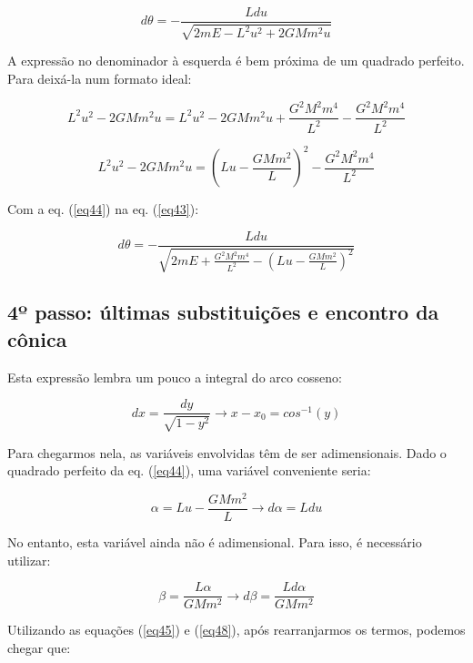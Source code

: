 \begin{equation}
	d\theta = -\frac{Ldu}{\sqrt{2mE -  L^2u^2 + 2GMm^2u}} \label{eq43}
\end{equation}

A expressão no denominador à esquerda é bem próxima de um quadrado perfeito. Para deixá-la num formato ideal:

\[
	L^2u^2 - 2GMm^2u = L^2u^2 - 2GMm^2u + \frac{G^2M^2m^4}{L^2} - \frac{G^2M^2m^4}{L^2}
\]

\begin{equation}
	L^2u^2 - 2GMm^2u = \left(Lu - \frac{GMm^2}{L}\right)^2 - \frac{G^2M^2m^4}{L^2} \label{eq44}
\end{equation}

Com a eq. (\ref{eq44}) na eq. (\ref{eq43}):

\begin{equation}
	d\theta = -\frac{Ldu}{\sqrt{2mE + \frac{G^2M^2m^4}{L^2} - \left(Lu - \frac{GMm^2}{L}\right)^2}}
	\label{eq45}
\end{equation}

\subsection{4º passo: últimas substituições e encontro da cônica}

Esta expressão lembra um pouco a integral do arco cosseno:

\begin{equation}
	dx = \frac{dy}{\sqrt{1-y^2}}\rightarrow x- x_0 = cos^{-1}(y) \label{eq46}
\end{equation}

Para chegarmos nela, as variáveis envolvidas têm de ser adimensionais. Dado o quadrado perfeito da eq.  (\ref{eq44}), uma variável conveniente seria:

\begin{equation}
	\alpha = Lu - \frac{GMm^2}{L}  \rightarrow d\alpha = Ldu \label{eq47}
\end{equation}

No entanto, esta variável ainda não é adimensional. Para isso, é necessário utilizar:

\begin{equation}
	\beta = \frac{L\alpha}{GMm^2} \rightarrow d\beta = \frac{Ld\alpha}{GMm^2} \label{eq48}
\end{equation}

Utilizando as equações (\ref{eq45}) e (\ref{eq48}), após rearranjarmos os termos, podemos chegar que:

